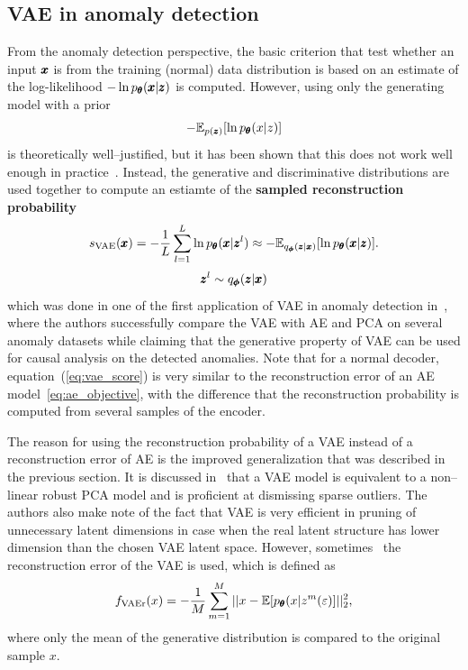 \subsection{VAE in anomaly detection}
From the anomaly detection perspective, the basic criterion that test whether an input $\pmb{{x}}$ is from the training (normal) data distribution is based on an estimate of the log-likelihood $- \ln p_{\pmb{{\theta}}}(\pmb{{x}}|\pmb{{z}})$ is computed. However, using only the generating model with a prior
\begin{equation}
- \mathbb{E}_{p(\vc{z})}\left[\ln p_{\vc{\theta}}(x|z)\right]
\end{equation}
is theoretically well--justified, but it has been shown that this does not work well enough in practice~\cite{xu2018unsupervised}. Instead, the generative and discriminative distributions are used together to compute an estiamte of the \textbf{sampled reconstruction probability}
\begin{equation} \label{eq:rec_prob}
s_{\text{VAE}}(\vc{x})=-\frac{1}{L}\sum_{l=1}^{L}\ln p_{\vc{\theta}}(\vc{x}|\vc{z}^{l}) \approx-\mathbb{E}_{q_{\vc{\phi}}(\vc{z}|\vc{x})}\left[\ln p_{\vc{\theta}}(\vc{x}|\vc{z})\right].
\end{equation}
\begin{equation}
\pmb{{z}}^l \sim q_{\pmb{{\phi}}}(\pmb{{z}}|\pmb{{x}}) \nonumber 
\end{equation}
which was done in one of the first application of VAE in anomaly detection in~\cite{an2015variational}, where the authors successfully compare the VAE with AE and PCA on several anomaly datasets while claiming that the generative property of VAE can be used for causal analysis on the detected anomalies. Note that for a normal decoder, equation~(\ref{eq:vae_score}) is very similar to the reconstruction error of an  AE model~\eqref{eq:ae_objective}, with the difference that the reconstruction probability is computed from several samples of the encoder.

The reason for using the reconstruction probability of a VAE instead
of a reconstruction error of AE is the improved generalization that
was described in the previous section. It is discussed in~\cite{dai2017hidden}
that a VAE model is equivalent to a non--linear robust PCA model
and is proficient at dismissing sparse outliers. The authors also
make note of the fact that VAE is very efficient in pruning of unnecessary
latent dimensions in case when the real latent structure has lower
dimension than the chosen VAE latent space. However, sometimes~\cite{pereira2018unsupervised}
the reconstruction error of the VAE is used, which is defined as
\begin{equation}
f_{\text{VAEr}}(x)=-\frac{1}{M}\sum_{m=1}^{M}||x-\mathbb{E}\left[p_{\vc{\theta}}(x|z^{m}(\varepsilon)\right]||_{2}^{2},
\end{equation}
where only the mean of the generative distribution is compared to
the original sample $x$.

